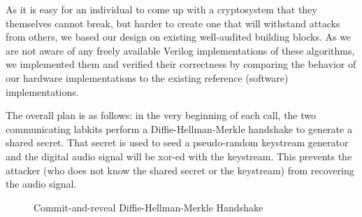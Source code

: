 \documentclass[a4paper]{report}
\begin{document}
As it is easy for an individual to come up with a cryptosystem that they
themselves cannot break, but harder to create one that will %
withstand attacks
from others, we based our design on existing well-audited building
blocks. As we are not aware of any freely available Verilog implementations of
these algorithms, we implemented them and verified their correctness by
comparing the behavior of our hardware implementations to the existing reference
(software) implementations.

The overall plan is as follows: in the very beginning of each call, the two
communicating labkits perform a Diffie-Hellman-Merkle handshake to generate a
shared secret. That secret is used to seed a pseudo-random keystream
generator and the digital audio signal will be xor-ed with the keystream.
This prevents the attacker (who does not know the shared secret or the
keystream) from recovering the audio signal.


\begin{figure}[h!]
\centering
{}
\caption{Commit-and-reveal Diffie-Hellman-Merkle Handshake}
\end{figure}
\end{document}
